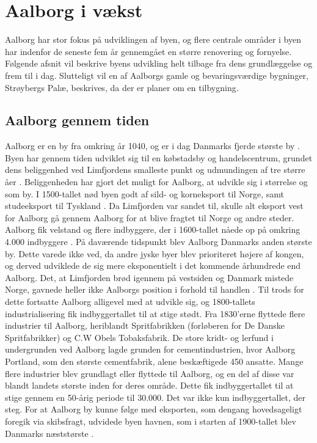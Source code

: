\chapter{Aalborg i vækst}
Aalborg har stor fokus på udviklingen af byen, og flere centrale områder i byen har indenfor de seneste fem år gennemgået en større renovering og fornyelse. Følgende afsnit vil beskrive byens udvikling helt tilbage fra dens grundlæggelse og frem til i dag. Slutteligt vil en af Aalborgs gamle og bevaringsværdige bygninger, Strøybergs Palæ, beskrives, da der er planer om en tilbygning. 

\section{Aalborg gennem tiden}
Aalborg er en by fra omkring år 1040, og er i dag Danmarks fjerde største by \citep{Denstore}. Byen har gennem tiden udviklet sig til en købstadsby og handelscentrum, grundet dens beliggenhed ved Limfjordens smalleste punkt og udmundingen af tre større åer \citep{byhistorie}. Beliggenheden har gjort det muligt for Aalborg, at udvikle sig i størrelse og som by. I 1500-tallet nød byen godt af sild- og korneksport til Norge, samt studeeksport til Tyskland \citep{byhistorie}. Da Limfjorden var sandet til, skulle alt eksport vest for Aalborg gå gennem Aalborg for at blive fragtet til Norge og andre steder. Aalborg fik velstand og flere indbyggere, der i 1600-tallet nåede op på omkring 4.000 indbyggere \citep{indbyggertal}. På daværende tidspunkt blev Aalborg Danmarks anden største by. Dette varede ikke ved, da andre jyske byer blev prioriteret højere af kongen, og derved udviklede de sig mere eksponentielt i det kommende århundrede end Aalborg. Det, at Limfjorden brød igennem på vestsiden og Danmark mistede Norge, gavnede heller ikke Aalborgs position i forhold til handlen \citep{indbyggertal}.
\newline \indent{     }  Til trods for dette fortsatte Aalborg alligevel med at udvikle sig, og 1800-tallets industrialisering fik indbyggertallet til at stige stødt. Fra 1830’erne flyttede flere industrier til Aalborg, heriblandt Spritfabrikken (forløberen for De Danske Spritfabrikker) og C.W Obels Tobaksfabrik. 
\newline \indent{     }  De store kridt- og lerfund i undergrunden ved Aalborg lagde grunden for cementindustrien, hvor Aalborg Portland, som den største cementfabrik, alene beskæftigede 450 ansatte. Mange flere industrier blev grundlagt eller flyttede til Aalborg, og en del af disse var blandt landets største inden for deres område. Dette fik indbyggertallet til at stige gennem en 50-årig periode til 30.000. Det var ikke kun indbyggertallet, der steg. For at Aalborg by kunne følge med eksporten, som dengang hovedsageligt foregik via skibsfragt, udvidede byen havnen, som i starten af 1900-tallet blev Danmarks næststørste \citep{byhistorie}.
